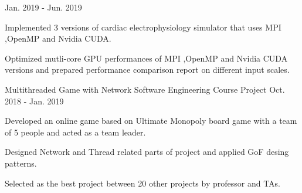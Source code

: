 \begin{cventries}
    {} %
    {Jan. 2019 - Jun. 2019} %
    {
      \begin{cvitems} %
      	\item {Implemented 3 versions of cardiac electrophysiology simulator that uses MPI ,OpenMP and Nvidia CUDA.}
      	\item {Optimized mutli-core GPU performances of MPI ,OpenMP and Nvidia CUDA versions and prepared performance comparison report on different input scales.}
      \end{cvitems}
    }
\cvopenentry
   {Multithreaded Game with Network} %
    {Software Engineering Course Project} %
    {} %
    {Oct. 2018 - Jan. 2019} %
    {
      \begin{cvitems} %
      	\item {Developed an online game based on Ultimate Monopoly board game with a team of 5 people and acted as a team leader.} 
      	\item {Designed Network and Thread related parts of project and applied GoF desing patterns.} 
      	\item {Selected as the best project between 20 other projects by professor and TAs.} 
      \end{cvitems}
    }

\end{cventries}
